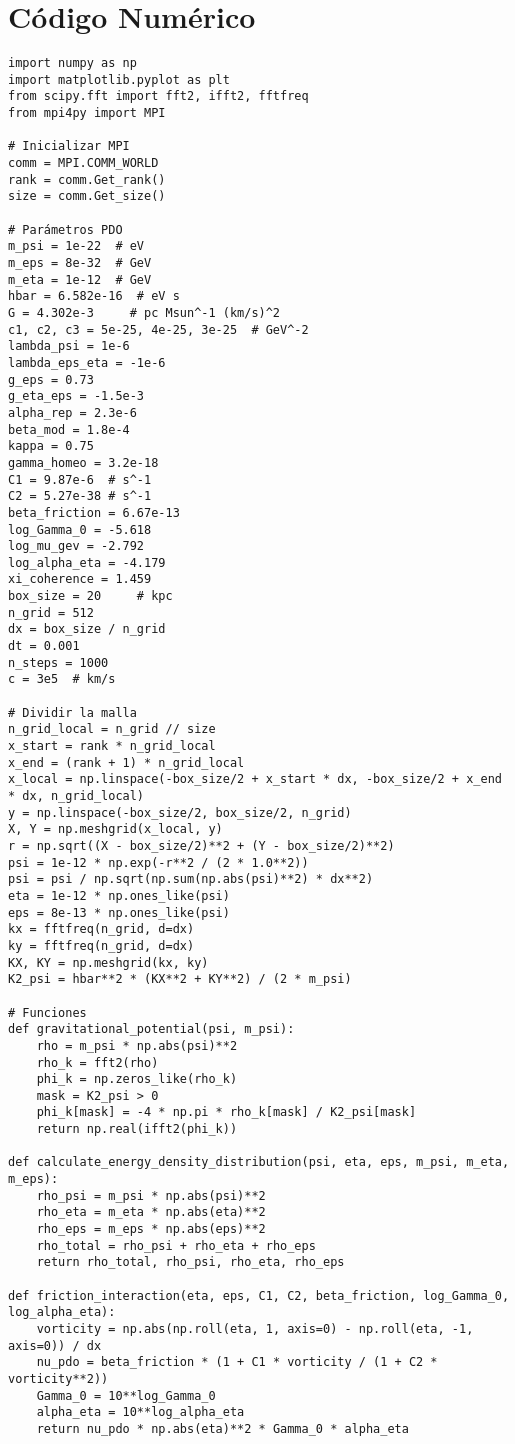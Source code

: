 \documentclass[a4paper,12pt]{article}
\begin{document}
\section{Código Numérico}
\begin{verbatim}
import numpy as np
import matplotlib.pyplot as plt
from scipy.fft import fft2, ifft2, fftfreq
from mpi4py import MPI

# Inicializar MPI
comm = MPI.COMM_WORLD
rank = comm.Get_rank()
size = comm.Get_size()

# Parámetros PDO
m_psi = 1e-22  # eV
m_eps = 8e-32  # GeV
m_eta = 1e-12  # GeV
hbar = 6.582e-16  # eV s
G = 4.302e-3     # pc Msun^-1 (km/s)^2
c1, c2, c3 = 5e-25, 4e-25, 3e-25  # GeV^-2
lambda_psi = 1e-6
lambda_eps_eta = -1e-6
g_eps = 0.73
g_eta_eps = -1.5e-3
alpha_rep = 2.3e-6
beta_mod = 1.8e-4
kappa = 0.75
gamma_homeo = 3.2e-18
C1 = 9.87e-6  # s^-1
C2 = 5.27e-38 # s^-1
beta_friction = 6.67e-13
log_Gamma_0 = -5.618
log_mu_gev = -2.792
log_alpha_eta = -4.179
xi_coherence = 1.459
box_size = 20     # kpc
n_grid = 512
dx = box_size / n_grid
dt = 0.001
n_steps = 1000
c = 3e5  # km/s

# Dividir la malla
n_grid_local = n_grid // size
x_start = rank * n_grid_local
x_end = (rank + 1) * n_grid_local
x_local = np.linspace(-box_size/2 + x_start * dx, -box_size/2 + x_end * dx, n_grid_local)
y = np.linspace(-box_size/2, box_size/2, n_grid)
X, Y = np.meshgrid(x_local, y)
r = np.sqrt((X - box_size/2)**2 + (Y - box_size/2)**2)
psi = 1e-12 * np.exp(-r**2 / (2 * 1.0**2))
psi = psi / np.sqrt(np.sum(np.abs(psi)**2) * dx**2)
eta = 1e-12 * np.ones_like(psi)
eps = 8e-13 * np.ones_like(psi)
kx = fftfreq(n_grid, d=dx)
ky = fftfreq(n_grid, d=dx)
KX, KY = np.meshgrid(kx, ky)
K2_psi = hbar**2 * (KX**2 + KY**2) / (2 * m_psi)

# Funciones
def gravitational_potential(psi, m_psi):
    rho = m_psi * np.abs(psi)**2
    rho_k = fft2(rho)
    phi_k = np.zeros_like(rho_k)
    mask = K2_psi > 0
    phi_k[mask] = -4 * np.pi * rho_k[mask] / K2_psi[mask]
    return np.real(ifft2(phi_k))

def calculate_energy_density_distribution(psi, eta, eps, m_psi, m_eta, m_eps):
    rho_psi = m_psi * np.abs(psi)**2
    rho_eta = m_eta * np.abs(eta)**2
    rho_eps = m_eps * np.abs(eps)**2
    rho_total = rho_psi + rho_eta + rho_eps
    return rho_total, rho_psi, rho_eta, rho_eps

def friction_interaction(eta, eps, C1, C2, beta_friction, log_Gamma_0, log_alpha_eta):
    vorticity = np.abs(np.roll(eta, 1, axis=0) - np.roll(eta, -1, axis=0)) / dx
    nu_pdo = beta_friction * (1 + C1 * vorticity / (1 + C2 * vorticity**2))
    Gamma_0 = 10**log_Gamma_0
    alpha_eta = 10**log_alpha_eta
    return nu_pdo * np.abs(eta)**2 * Gamma_0 * alpha_eta


\end{verbatim}
\end{document}
